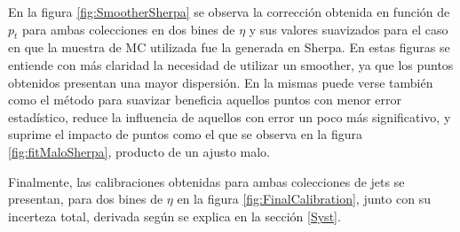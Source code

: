 En la figura \ref{fig:SmootherSherpa} se observa la corrección obtenida en función de $p_t$ para ambas colecciones en dos bines de $\eta$ y sus valores suavizados para el caso en que la muestra de MC utilizada fue la generada en Sherpa. En estas figuras se entiende con más claridad la necesidad de utilizar un smoother, ya que los puntos obtenidos presentan una mayor dispersión. En la mismas puede verse también como el método para suavizar beneficia aquellos puntos con menor error estadístico, reduce la influencia de aquellos con error un poco más significativo, y suprime el impacto de puntos como el que se observa en la figura \ref{fig:fitMaloSherpa}, producto de un ajusto malo. 

Finalmente, las calibraciones obtenidas para ambas colecciones de jets se presentan, para dos bines de $\eta$ en la figura \ref{fig:FinalCalibration}, junto con su incerteza total, derivada según se explica en la sección \ref{Syst}.

